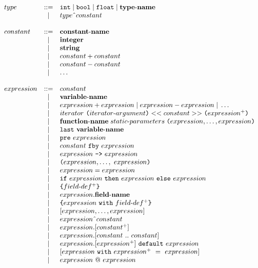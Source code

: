 \documentclass[a4paper]{article}
\newcommand{\p}[0]{\; \vert \;}
\newcommand{\Coloneqq}[0]{::=}
\begin{document}
\newcommand{\lp}{\texttt{(}}
\newcommand{\rp}{\texttt{)}}
\newcommand{\lcb}{\texttt{\{}}
\newcommand{\rcb}{\texttt{\}}}

\[
\begin{array}{lcl}
  type & \Coloneqq & \mathtt{int} \p \mathtt{bool} \p \mathtt{float} \p
    {\bf type\sdash{}name} \\
  & | & type \spow{} constant \\

  \\

  constant & \Coloneqq & {\bf constant\sdash{}name} \\
  & | & {\bf integer} \\
  & | & {\bf string} \\
  & | & constant + constant \\
  & | & constant - constant \\
  & | & \dots \\

  \\

  expression & \Coloneqq & constant \\
  & | & {\bf variable\sdash{}name} \\
  & | & expression + expression \p expression - expression \p \dots \\
  & | &
    iterator \  \lp{}iterator\sdash{}argument\rp{}
    \piquots{constant} \lp{}expression^+\rp{}
    \\
  & | &
    {\bf function\sdash{}name} \; static\sdash{}parameters \;
    \lp{}expression,\dots,expression\rp{} \\
  & | & \mathtt{last} \  {\bf variable\sdash{}name} \\
  & | & \mathtt{pre} \  expression \\
  & | & constant \  \mathtt{fby} \  expression \\
  & | & expression \  \texttt{->} \  expression \\
  & | & \lp{}expression,\dots,\ expression\rp{} \\
  & | & expression = expression \\
  & | & \mathtt{if} \ expression \ \mathtt{then} \ expression \ 
    \mathtt{else} \ expression \\
  & | & \lcb{} field\sdash{}def^+ \rcb{} \\
  & | & expression.{\bf field\sdash{}name} \\
  & | & \lcb{} expression
    \ \mathtt{with} \  field\sdash{}def^+ \rcb{} \\
  & | & [ expression, \dots, expression ] \\
  & | & expression \spow{} constant \\
  & | & expression.[constant^+] \\
  & | & expression.[constant \  .. \ constant] \\
  & | & expression.[expression^+] \ \mathtt{default} \  expression \\
  & | & [ expression \ \mathtt{with} \ expression^+ \ = \ expression ] \\
  & | & expression \ @ \ expression \\


\end{array}\]
\end{document}
